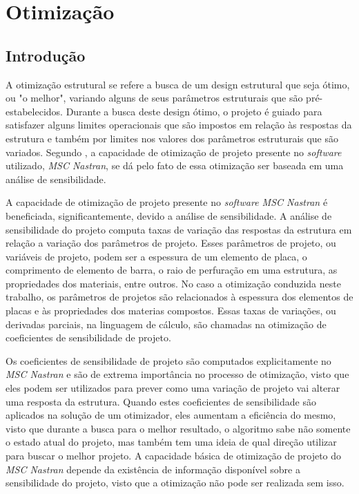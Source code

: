 \chapter[Otimização]{Otimização}

\section{Introdução}
A otimização estrutural se refere a busca de um design estrutural que seja ótimo, ou "o melhor", variando alguns de seus parâmetros estruturais que são pré-estabelecidos. Durante a busca deste design ótimo, o projeto é guiado para satisfazer alguns limites operacionais que são impostos em relação às respostas da estrutura e também por limites nos valores dos parâmetros estruturais que são variados. Segundo \cite{moore1994msc}, a capacidade de otimização de projeto presente no \emph{software} utilizado, \emph{MSC Nastran}, se dá pelo fato de essa otimização ser baseada em uma análise de sensibilidade.

A capacidade de otimização de projeto presente no \emph{software MSC Nastran} é beneficiada, significantemente, devido a análise de sensibilidade. A análise de sensibilidade do projeto computa taxas de variação das respostas da estrutura em relação a variação dos parâmetros de projeto. Esses parâmetros de projeto, ou variáveis de projeto, podem ser a espessura de um elemento de placa, o comprimento de elemento de barra, o raio de perfuração em uma estrutura, as propriedades dos materiais, entre outros. No caso a otimização conduzida neste trabalho, os parâmetros de projetos são relacionados à espessura dos elementos de placas e às propriedades dos materias compostos. Essas taxas de variações, ou derivadas parciais, na linguagem de cálculo, são chamadas na otimização de coeficientes de sensibilidade de projeto.

Os coeficientes de sensibilidade de projeto são computados explicitamente no \emph{MSC Nastran} e são de extrema importância no processo de otimização, visto que eles podem ser utilizados para prever como uma variação de projeto vai alterar uma resposta da estrutura. Quando estes coeficientes de sensibilidade são aplicados na solução de um otimizador, eles aumentam a eficiência do mesmo, visto que durante a busca para o melhor resultado, o algoritmo sabe não somente o estado atual do projeto, mas também tem uma ideia de qual direção utilizar para buscar o melhor projeto. A capacidade básica de otimização de projeto do \emph{MSC Nastran} depende da existência de informação disponível sobre a sensibilidade do projeto, visto que a otimização não pode ser realizada sem isso.

